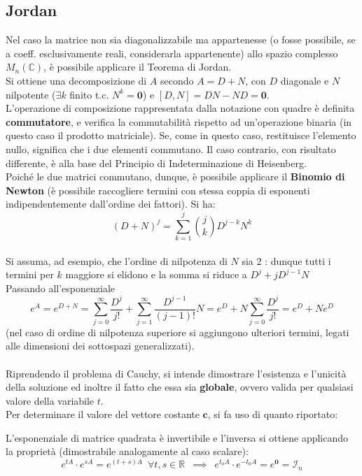 \documentclass[10pt, oneside]{book}
\theoremstyle{plain}
\begin{document}
\subsection{Jordan}
Nel caso la matrice non sia diagonalizzabile ma appartenesse (o fosse possibile, se a coeff. esclusivamente reali, considerarla appartenente) allo spazio complesso $M_n(\mathbb{C})$, è possibile applicare il Teorema di Jordan.
\\Si ottiene una decomposizione di $A$ secondo $A = D + N$, con $D$ diagonale e $N$ nilpotente ($\exists k$ finito t.c. $N^k = \mathbf{0}$) e $[D, N] = DN - ND = \mathbf{0}$. 
\\L'operazione di composizione rappresentata dalla notazione con quadre è definita \textbf{commutatore}, e verifica la commutabilità rispetto ad un'operazione binaria (in questo caso il prodotto matriciale). Se, come in questo caso, restituisce l'elemento nullo, significa che i due elementi commutano. Il caso contrario, con risultato differente, è alla base del Principio di Indeterminazione di Heisenberg.
\\Poiché le due matrici commutano, dunque, è possibile applicare il \textbf{Binomio di Newton} (è possibile raccogliere termini con stessa coppia di esponenti indipendentemente dall'ordine dei fattori). Si ha:
\[(D + N)^j = \sum\limits_{k=1}^j \binom{j}{k}D^{j - k}N^k\]
\\Si assuma, ad esempio, che l'ordine di nilpotenza di $N$ sia $2$ : dunque tutti i termini per $k$ maggiore si elidono e la somma si riduce a $D^j + j D^{j-1}N$
\\Passando all'esponenziale
\[e^A = e^{D+N} = \sum\limits_{j=0}^\infty \frac{D^j}{j!} + \sum\limits_{j = 1}^\infty \frac{D^{j-1}}{(j-1)!}N = e^D + N \sum\limits_{j=0}^\infty \frac{D^j}{j!} = e^D + N e^D\]
(nel caso di ordine di nilpotenza superiore si aggiungono ulteriori termini, legati alle dimensioni dei sottospazi generalizzati).
\\~\\Riprendendo il problema di Cauchy, si intende dimostrare l'esistenza e l'unicità della soluzione ed inoltre il fatto che essa sia \textbf{globale}, ovvero valida per qualsiasi valore della variabile $t$.
\\Per determinare il valore del vettore costante $\mathbf{c}$, si fa uso di quanto riportato:
\begin{oss}
L'esponenziale di matrice quadrata è invertibile e l'inversa si ottiene applicando la proprietà (dimostrabile analogamente al caso scalare):
\[e^{tA} \cdot e^{sA} = e^{(t+s)A} \enspace \forall t,s \in \mathbb{R} \enspace \implies \enspace e^{t_0 A} \cdot e^{- t_0 A} = e^{\mathbf{0}} = \mathcal{I}_n\]
\end{oss}
\end{document}
